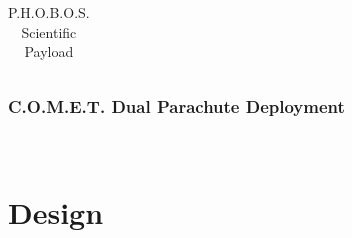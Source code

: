 \documentclass[11pt]{IEEEtran}
\newcommand{\comet}{C.O.M.E.T.}
\newcommand{\phobos}{P.H.O.B.O.S.}
\begin{document}
\begin{table}[H]
\begin{tabular}{ccccp{6cm}}
    \end{tabular}
    \vspace{3mm}
    \caption{\phobos{} Scientific Payload}
    \label{tab:PhobosReq}
\end{table}

\subsubsection*{\comet{} Dual Parachute Deployment}
~\\


\section{Design}


\end{document}
